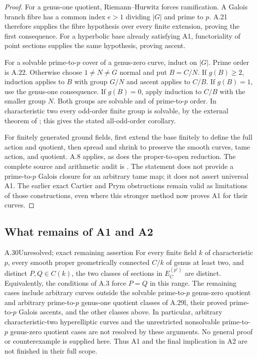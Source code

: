 \begin{proof}
For a genus-one quotient, Riemann--Hurwitz forces
ramification. A Galois branch fibre has a common
index $e>1$ dividing $|G|$ and prime to $p$.
A.21 therefore supplies the fibre hypothesis over
every finite extension, proving the first consequence.
For a hyperbolic base already satisfying A1,
functoriality of point sections supplies the same
hypothesis, proving ascent.

For a solvable prime-to-$p$ cover of a genus-zero
curve, induct on $|G|$. Prime order is A.22.
Otherwise choose $1\ne N\ne G$ normal and put
$B=C/N$. If $g(B)\ge2$, induction applies to
$B$ with group $G/N$ and ascent applies to $C/B$.
If $g(B)=1$, use the genus-one consequence.
If $g(B)=0$, apply induction to $C/B$ with the
smaller group $N$. Both groups are solvable and
of prime-to-$p$ order. In characteristic two
every odd-order finite group is solvable, by
the external theorem of \citet[Chapter I, p.~775]
{A_FeitThompson1963}; this gives the stated
all-odd-order corollary.

For finitely generated ground fields, first extend
the base finitely to define the full action and
quotient, then spread and shrink to preserve the
smooth curves, tame action, and quotient. A.8
applies, as does the proper-to-open reduction.
The complete source and arithmetic audit is
.
The statement does not provide a prime-to-$p$
Galois closure for an arbitrary tame map; it does
not assert universal A1. The earlier exact
Cartier and Prym obstructions remain valid as
limitations of those constructions, even where
this stronger method now proves A1 for their curves.
\end{proof}

\subsection{What remains of A1 and A2}

\begin{claim}{A.30}{Unresolved; exact remaining assertion}
For every finite field $k$ of characteristic $p$, every smooth proper
geometrically connected $C/k$ of genus at least two, and distinct
$P,Q\in C(k)$, the two classes of sections in $E_C^{(p')}$ are
distinct. Equivalently, the conditions of A.3 force $P=Q$ in this
range. The remaining cases include arbitrary curves outside the
solvable prime-to-$p$ genus-zero quotient and arbitrary
prime-to-$p$ genus-one quotient classes of A.29l, their
proved prime-to-$p$ Galois ascents, and the other classes
above. In particular, arbitrary characteristic-two
hyperelliptic curves and the unrestricted nonsolvable
prime-to-$p$ genus-zero quotient cases are not resolved
by these arguments. No general proof or counterexample is
supplied here. Thus A1 and the final implication in A2 are not
finished in their full scope.
\end{claim}

